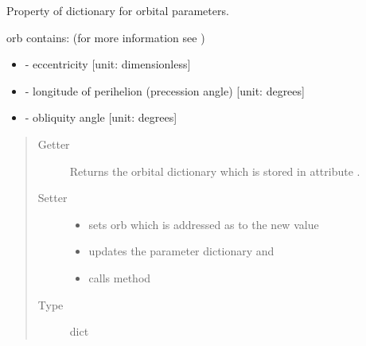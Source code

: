 \documentclass[letterpaper,10pt,english]{sphinxmanual}
\begin{document}
\begin{fulllineitems}
\begin{quote}
\begin{description}
\begin{itemize}
\end{itemize}

\end{description}\end{quote}

\begin{fulllineitems}
\label{api/climlab.radiation:climlab.radiation.insolation.AnnualMeanInsolation.orb}
Property of dictionary for orbital parameters.

orb contains: (for more information see {\hyperref[api/climlab.solar:climlab.solar.orbital.OrbitalTable]{\emph{}}})
\begin{itemize}
\item {} 
 - eccentricity {[}unit: dimensionless{]}

\item {} 
 - longitude of perihelion (precession angle) {[}unit: degrees{]}

\item {} 
 - obliquity angle {[}unit: degrees{]}

\end{itemize}
\begin{quote}\begin{description}
\item[{Getter}] \leavevmode
Returns the orbital dictionary which is stored in attribute 
.

\item[{Setter}] \leavevmode\begin{itemize}
\item {} 
sets orb which is addressed as  to the new value

\item {} 
updates the parameter dictionary  and

\item {} 
calls method 

\end{itemize}

\item[{Type}] \leavevmode
dict

\end{description}\end{quote}

\end{fulllineitems}


\end{fulllineitems}
\end{document}
